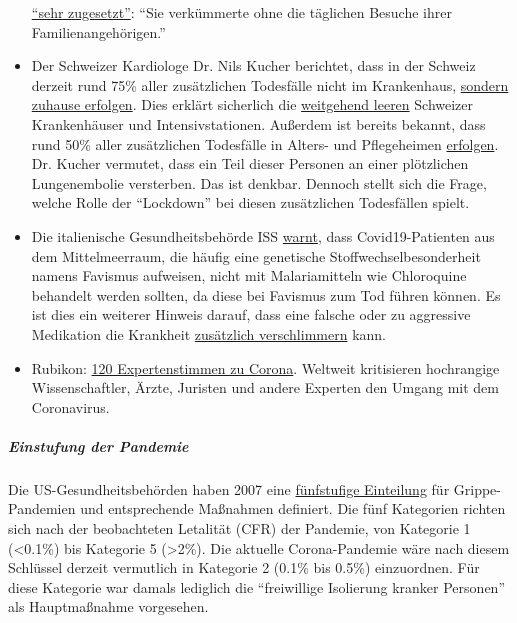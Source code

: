 \begin{itemize}
  \href{https://swprs.files.wordpress.com/2020/04/tagblatt-109.jpg}{``sehr
  zugesetzt''}: ``Sie verkümmerte ohne die täglichen Besuche ihrer
  Familienangehörigen.''
\item
  Der Schweizer Kardiologe Dr. Nils Kucher berichtet, dass in der
  Schweiz derzeit rund 75\% aller zusätzlichen Todesfälle nicht im
  Krankenhaus,
  \href{https://www.tagesspiegel.de/wissen/woran-sterben-corona-patienten-wirklich-ein-schweizer-forscher-macht-hoffnung-im-kampf-gegen-covid-19/25750666.html}{sondern
  zuhause erfolgen}. Dies erklärt sicherlich die
  \href{https://swprs.files.wordpress.com/2020/04/intensivbettenbelegung-schweiz-2020-04-14.png}{weitgehend
  leeren} Schweizer Krankenhäuser und Intensivstationen. Außerdem ist
  bereits bekannt, dass rund 50\% aller zusätzlichen Todesfälle in
  Alters- und Pflegeheimen
  \href{https://www.nzz.ch/zuerich/coronavirus-zuerich-aendert-nun-das-testregime-in-heimenauch-viele-aeltere-covid-19-infizierte-entwickeln-keine-symptome-zuerich-aendert-nun-das-testregime-in-heimen-ld.1552089}{erfolgen}.
  Dr. Kucher vermutet, dass ein Teil dieser Personen an einer
  plötzlichen Lungenembolie versterben. Das ist denkbar. Dennoch stellt
  sich die Frage, welche Rolle der ``Lockdown'' bei diesen zusätzlichen
  Todesfällen spielt.
\item
  Die italienische Gesundheitsbehörde ISS
  \href{https://www.iss.it/en/rapporti-covid-19/-/asset_publisher/btw1J82wtYzH/content/id/5334891}{warnt},
  dass Covid19-Patienten aus dem Mittelmeerraum, die häufig eine
  genetische Stoffwechselbesonderheit namens Favismus aufweisen, nicht
  mit Malariamitteln wie Chloroquine behandelt werden sollten, da diese
  bei Favismus zum Tod führen können. Es ist dies ein weiterer Hinweis
  darauf, dass eine falsche oder zu aggressive Medikation die Krankheit
  \href{https://www.sciencedaily.com/releases/2020/02/200206110703.htm}{zusätzlich
  verschlimmern} kann.
\item
  Rubikon:
  \href{https://www.rubikon.news/artikel/120-expertenstimmen-zu-corona}{120
  Expertenstimmen zu Corona}. Weltweit kritisieren hochrangige
  Wissenschaftler, Ärzte, Juristen und andere Experten den Umgang mit
  dem Coronavirus.
\end{itemize}

\hypertarget{einstufung-der-pandemie}{%
\subparagraph{\texorpdfstring{\textbf{Einstufung der
Pandemie}}{Einstufung der Pandemie}}\label{einstufung-der-pandemie}}

Die US-Gesundheitsbehörden haben 2007 eine
\href{https://www.cidrap.umn.edu/news-perspective/2007/02/hhs-ties-pandemic-mitigation-advice-severity}{fünfstufige
Einteilung} für Grippe-Pandemien und entsprechende Maßnahmen definiert.
Die fünf Kategorien richten sich nach der beobachteten Letalität (CFR)
der Pandemie, von Kategorie 1 (\textless{}0.1\%) bis Kategorie 5
(\textgreater{}2\%). Die aktuelle Corona-Pandemie wäre nach diesem
Schlüssel derzeit vermutlich in Kategorie 2 (0.1\% bis 0.5\%)
einzuordnen. Für diese Kategorie war damals lediglich die ``freiwillige
Isolierung kranker Personen'' als Hauptmaßnahme vorgesehen.

